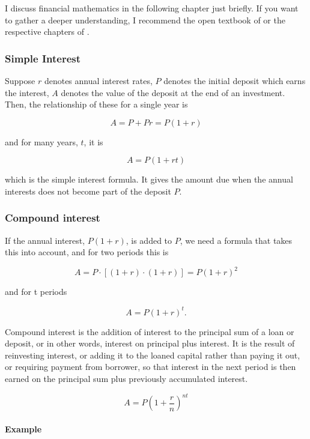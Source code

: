 \documentclass[
  12pt,
  oneside]{book}
\theoremstyle{definition}
\theoremstyle{definition}
\theoremstyle{definition}
\theoremstyle{definition}
\theoremstyle{remark}
\begin{document}
I discuss financial mathematics in the following chapter just briefly. If you want to gather a deeper understanding, I recommend the open textbook of \citet{Dahlquist2022Principles} or the respective chapters of \citet{Wilkinson2022Managerial}.

\hypertarget{simple-interest}{%
\subsubsection{Simple Interest}\label{simple-interest}}

Suppose \(r\) denotes annual interest rates, \(P\) denotes the initial deposit which earns the interest, \(A\) denotes the value of the deposit at the end of an investment. Then, the relationship of these for a single year is

\[
A=P+Pr=P(1+r)
\]

and for many years, \(t\), it is

\[
A=P(1+rt)
\]

which is the simple interest formula. It gives the amount due when the annual interests does not become part of the deposit \(P\).

\hypertarget{compound-interest}{%
\subsubsection{Compound interest}\label{compound-interest}}

If the annual interest, \(P(1+r)\), is added to \(P\), we need a formula that takes this into account, and for two periods this is

\[
A=P\cdot  [(1+r)\cdot(1+r)]=P(1+r)^2
\]

and for t periods

\[
A=P(1+r)^t.
\]

Compound interest is the addition of interest to the principal sum of a loan or deposit, or in other words, interest on principal plus interest. It is the result of reinvesting interest, or adding it to the loaned capital rather than paying it out, or requiring payment from borrower, so that interest in the next period is then earned on the principal sum plus previously accumulated interest.

\[
A=P\left(1+\frac{r}{n}\right)^{nt}
\]

\hypertarget{example}{%
\paragraph*{Example}\label{example}}
\end{document}
